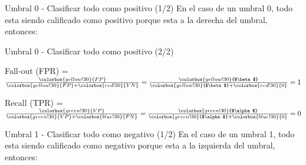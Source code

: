 \documentclass{beamer}
\begin{document}
\begin{frame}{Umbral 0 - Clasificar todo como positivo (1/2)}
    En el caso de un umbral 0, todo esta siendo calificado como positivo porque esta a la derecha del umbral, entonces:

    \begin{center}
    \end{center}
\end{frame}

\begin{frame}{Umbral 0 - Clasificar todo como positivo (2/2)}
    \begin{center}
    Fall-out (FPR) = $\frac{\colorbox{yellow!30}{FP}}{\colorbox{yellow!30}{FP} + \colorbox{red!30}{VN}} = \frac{\colorbox{yellow!30}{$\beta$}}{\colorbox{yellow!30}{$\beta$} + \colorbox{red!30}{0}} = 1$

    Recall (TPR) = $\frac{\colorbox{green!30}{VP}}{\colorbox{green!30}{VP} + \colorbox{blue!30}{FN}} = \frac{\colorbox{green!30}{$\alpha$}}{\colorbox{green!30}{$\alpha$} + \colorbox{blue!30}{0}} = 0$
    \end{center}
\end{frame}

\begin{frame}{Umbral 1 - Clasificar todo como negativo (1/2)}
    En el caso de un umbral 1, todo esta siendo calificado como negativo porque esta a la izquierda del umbral, entonces:

    \begin{center}
    \end{center}
\end{frame}
\end{document}
